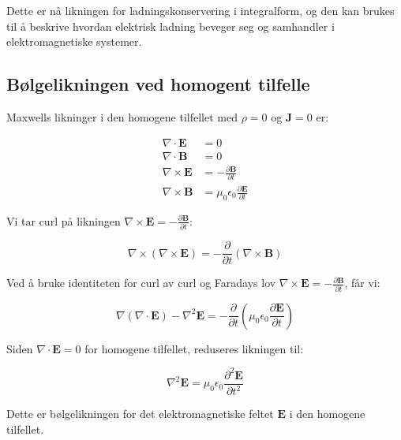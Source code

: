 Dette er nå likningen for ladningskonservering i integralform, og den kan brukes til å beskrive hvordan elektrisk ladning beveger seg og samhandler i elektromagnetiske systemer.

\subsection*{Bølgelikningen ved homogent tilfelle}
Maxwells likninger i den homogene tilfellet med $\rho=0$ og $\mathbf{J}=0$ er:

\begin{align*}
\nabla \cdot \mathbf{E} &= 0 \\
\nabla \cdot \mathbf{B} &= 0 \\      
\nabla \times \mathbf{E} &= -\frac{\partial \mathbf{B}}{\partial t} \\           
\nabla \times \mathbf{B} &= \mu_0\epsilon_0\frac{\partial \mathbf{E}}{\partial t}
\end{align*}

Vi tar curl på likningen $\nabla \times \mathbf{E} = -\frac{\partial \mathbf{B}}{\partial t}$:

\begin{equation*}
\nabla \times (\nabla \times \mathbf{E}) = -\frac{\partial}{\partial t} (\nabla \times \mathbf{B})
\end{equation*}

Ved å bruke identiteten for curl av curl og Faradays lov $\nabla \times \mathbf{E} = -\frac{\partial \mathbf{B}}{\partial t}$, får vi:

\begin{equation*}
\nabla(\nabla \cdot \mathbf{E})-\nabla^2\mathbf{E} = -\frac{\partial}{\partial t}(\mu_0\epsilon_0\frac{\partial \mathbf{E}}{\partial t})
\end{equation*}

Siden $\nabla \cdot \mathbf{E} = 0$ for homogene tilfellet, reduseres likningen til:

\begin{equation*}
\nabla^2\mathbf{E} = \mu_0\epsilon_0\frac{\partial^2 \mathbf{E}}{\partial t^2}
\end{equation*}

Dette er bølgelikningen for det elektromagnetiske feltet $\mathbf{E}$ i den homogene tilfellet.